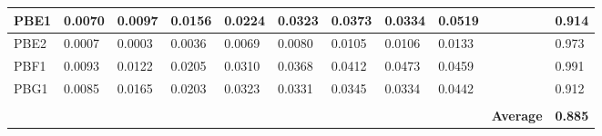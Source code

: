 \begin{tabular}{|l|l|l|l|l|l|l|l|l|l|l|}
PBE1           & 0.0070         & 0.0097         & 0.0156         & 0.0224         & 0.0323         & 0.0373         & 0.0334         & 0.0519         &                  & 0.914             \\ \hline
PBE2           & 0.0007         & 0.0003         & 0.0036         & 0.0069         & 0.0080         & 0.0105         & 0.0106         & 0.0133         &                  & 0.973             \\ \hline
PBF1           & 0.0093         & 0.0122         & 0.0205         & 0.0310         & 0.0368         & 0.0412         & 0.0473         & 0.0459         &                  & 0.991             \\ \hline
PBG1           & 0.0085         & 0.0165         & 0.0203         & 0.0323         & 0.0331         & 0.0345         & 0.0334         & 0.0442         &                  & 0.912             \\ \hline
               &                &                &                &                &                &                &                &                &                  &                   \\ \hline
               &                &                &                &                &                &                &                &                & \textbf{Average} & \textbf{0.885}    \\ \hline
\end{tabular}
